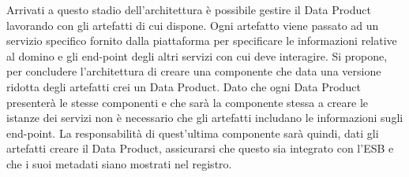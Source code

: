 \documentclass[12pt]{report}
\begin{document}
Arrivati a questo stadio dell'architettura è possibile gestire il Data Product lavorando con gli artefatti di cui dispone.
Ogni artefatto viene passato ad un servizio specifico fornito dalla piattaforma per specificare le informazioni relative al domino e gli end-point degli altri servizi con cui deve interagire.
Si propone, per concludere l'architettura di creare una componente che data una versione ridotta degli artefatti crei un Data Product.
Dato che ogni Data Product presenterà le stesse componenti e che sarà la componente stessa a creare le istanze dei servizi non è necessario che gli artefatti includano le informazioni sugli end-point.
La responsabilità di quest'ultima componente sarà quindi, dati gli artefatti creare il Data Product, assicurarsi che questo sia integrato con l'ESB e che i suoi metadati siano mostrati nel registro.
\end{document}
